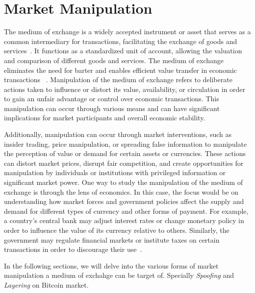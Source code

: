\section{Market Manipulation}
The medium of exchange is a widely accepted instrument or asset that serves as a common intermediary for transactions,
facilitating the exchange of goods and services~\cite{mankiw2014principles}. It functions as a standardized unit of account,
allowing the valuation and comparison of different goods and services. The medium of exchange eliminates the need for barter
and enables efficient value transfer in economic transactions ~\cite{friedman2004money}. Manipulation of the medium of
exchange refers to deliberate actions taken to influence or distort its value, availability, or circulation in order to
gain an unfair advantage or control over economic transactions. This manipulation can occur through various means and can
have significant implications for market participants and overall economic stability.

Additionally, manipulation can occur through market interventions, such as insider trading, price manipulation, or spreading
false information to manipulate the perception of value or demand for certain assets or currencies. These actions can distort
market prices, disrupt fair competition, and create opportunities for manipulation by individuals or institutions with privileged
information or significant market power. One way to study the manipulation of the medium of exchange is through the lens
of economics. In this case, the focus would be on understanding how market forces and government policies affect the supply
and demand for different types of currency and other forms of payment. For example, a country's central bank may adjust
interest rates or change monetary policy in order to influence the value of its currency relative to others. Similarly,
the government may regulate financial markets or institute taxes on certain transactions in order to discourage their
use~\cite{domanski2011currency}.

In the following sections, we will delve into the various forms of market manipulation a medium of exchahge can be target
of. Specially \emph{Spoofing} and \emph{Layering} on Bitcoin market.




